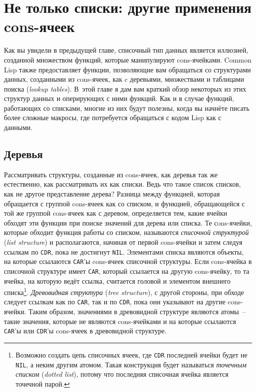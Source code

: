 \chapter{Не только списки: другие применения cons-ячеек}
\label{ch:13}

\thispagestyle{empty}

Как вы увидели в предыдущей главе, списочный тип данных является иллюзией, созданной
множеством функций, которые манипулируют cons-ячейками. Common Lisp также предоставляет
функции, позволяющие вам обращаться со структурами данных, созданными из cons-ячеек, как c
деревьями, множествами и таблицами поиска (\textit{lookup tables}). В~этой главе я дам
вам краткий обзор некоторых из этих структур данных и оперирующих с ними функций. Как и в
случае функций, работающих со списками, многие из них будут полезны, когда вы начнёте
писать более сложные макросы, где потребуется обращаться с кодом Lisp как с данными.

\section{Деревья}

Рассматривать структуры, созданные из cons-ячеек, как деревья так же естественно, как
рассматривать их как списки. Ведь что такое список списков, как не другое представление
дерева?  Разница между функцией, которая обращается с группой cons-ячеек как со списком, и
функцией, обращающейся с той же группой cons-ячеек как с деревом, определяется тем, какие
ячейки обходят эти функции при поиске значений для дерева или списка. Те сons-ячейки,
которые обходит функция работы со списком, называются \textit{списочной структурой}
(\textit{list structure}) и
располагаются, начиная от первой cons-ячейки и затем следуя ссылкам по \lstinline{CDR}, пока не
достигнут \lstinline{NIL}.  Элементами списка являются объекты, на которые ссылаются
\lstinline{CAR}'ы cons-ячеек списочной структуры. Если cons-ячейка в списочной структуре имеет
\lstinline{CAR}, который ссылается на другую cons-ячейку, то та ячейка, на которую ведёт
ссылка, считается головой и элементом внешнего списка\footnote{Возможно создать цепь
  списочных ячеек, где \lstinline{CDR} последней ячейки будет не \lstinline{NIL}, а неким другим
  атомом. Такая конструкция будет называться \textit{точечным списком} (\textit{dotted
    list}), потому что последняя списочная ячейка является точечной парой.}.
\textit{Древовидная структура} (\textit{tree structure}), с другой стороны, при обходе следует
ссылкам как по \lstinline{CAR}, так и по \lstinline{CDR}, пока они указывают на другие cons-ячейки. Таким
образом, значениями в древовидной структуре являются атомы~-- такие значения, которые не
являются cons-ячейками и на которые ссылаются \lstinline{CAR}'ы или \lstinline{CDR}'ы cons-ячеек в
древовидной структуре.

